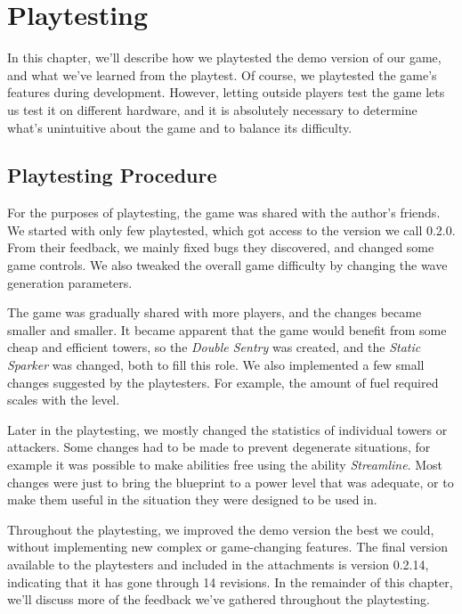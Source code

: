 \chapter{Playtesting}\label{playtesting}

In this chapter, we'll describe how we playtested the demo version of our game, and what we've learned from the playtest.
Of course, we playtested the game's features during development.
However, letting outside players test the game lets us test it on different hardware, and it is absolutely necessary to determine what's unintuitive about the game and to balance its difficulty.

\section{Playtesting Procedure}

For the purposes of playtesting, the game was shared with the author's friends.
We started with only few playtested, which got access to the version we call 0.2.0.
From their feedback, we mainly fixed bugs they discovered, and changed some game controls.
We also tweaked the overall game difficulty by changing the wave generation parameters.

The game was gradually shared with more players, and the changes became smaller and smaller.
It became apparent that the game would benefit from some cheap and efficient towers, so the \emph{Double Sentry} was created, and the \emph{Static Sparker} was changed, both to fill this role.
We also implemented a few small changes suggested by the playtesters.
For example, the amount of fuel required scales with the level.

Later in the playtesting, we mostly changed the statistics of individual towers or attackers.
Some changes had to be made to prevent degenerate situations, for example it was possible to make abilities free using the ability \emph{Streamline}.
Most changes were just to bring the blueprint to a power level that was adequate, or to make them useful in the situation they were designed to be used in.

Throughout the playtesting, we improved the demo version the best we could, without implementing new complex or game-changing features.
The final version available to the playtesters and included in the attachments is version 0.2.14, indicating that it has gone through 14 revisions.
In the remainder of this chapter, we'll discuss more of the feedback we've gathered throughout the playtesting.

